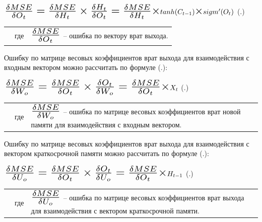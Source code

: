 {  \formulaspace \par \redline 
    $\scaleto{\frac{\delta MSE}{\delta O_t} = \frac{\delta MSE}{\delta H_t} \times \frac{\delta H_t}{\delta O_t} = \frac{\delta MSE}{\delta H_t} \times }{21pt} tanh(C_{t-1}) \scaleto{\times}{10pt} sigm'(O_t)$
    \hfill (\thechaptercntr .\theformulacntr) \redline
  \formulaspace \addtocounter{formulacntr}{1}

  \begin{tabular}{p{}p{}p{}}
    & где  & $\scaleto{\frac{\delta MSE}{\delta O_t}}{21pt}$ {--} ошибка по вектору врат выхода. \\
  \end{tabular}

  \par \redline Ошибку по матрице весовых коэффициентов врат выхода для взаимодействия с входным вектором можно рассчитать по формуле (\thechaptercntr .\theformulacntr):

  \formulaspace \par \redline 
    $\scaleto{\frac{\delta MSE}{\delta W_o} = \frac{\delta MSE}{\delta O_t} \times \frac{\delta O_t}{\delta W_o} = \frac{\delta MSE}{\delta O_t} \times }{22pt} X_t$
    \hfill (\thechaptercntr .\theformulacntr) \redline
  \formulaspace \addtocounter{formulacntr}{1}

  \begin{tabular}{p{}p{}p{}}
		& где  & $\scaleto{\frac{\delta MSE}{\delta W_o}}{21pt}$ {--} ошибка по матрице весовых коэффициентов врат новой памяти для взаимодействия с входным вектором. \\
  \end{tabular}

  \par \redline Ошибку по матрице весовых коэффициентов врат выхода для взаимодействия с вектором краткосрочной памяти можно рассчитать по формуле (\thechaptercntr .\theformulacntr):

  \formulaspace \par \redline 
    $\scaleto{\frac{\delta MSE}{\delta U_o} = \frac{\delta MSE}{\delta O_t} \times \frac{\delta O_t}{\delta U_o} = \frac{\delta MSE}{\delta O_t} \times }{22pt} H_{t-1}$
    \hfill (\thechaptercntr .\theformulacntr) \redline
  \formulaspace \addtocounter{formulacntr}{1}

  \begin{tabular}{p{}p{}p{}}
		& где  & $\scaleto{\frac{\delta MSE}{\delta U_o}}{21pt}$ {--} ошибка по матрице весовых коэффициентов врат выхода для взаимодействия с вектором краткосрочной памяти. \\
  \end{tabular}

}
